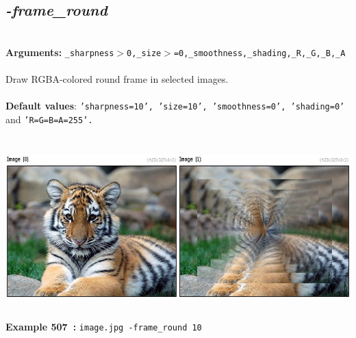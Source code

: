 \documentclass[a4paper,11pt,twoside]{book}
\begin{document}
\subsection{\emph{-frame\_round} }\vspace*{-0.5em}
~\\\textbf{Arguments: } 
{\small \texttt{\_sharpness$>$0,\_size$>$=0,\_smoothness,\_shading,\_R,\_G,\_B,\_A}}\\~\\
Draw RGBA-colored round frame in selected images.
~\\~\\\textbf{Default values}: {\small \texttt{'sharpness=10', 'size=10', 'smoothness=0', 'shading=0'} and \texttt{'R=G=B=A=255'.}}
\begin{center}\includegraphics[keepaspectratio=true,height=7cm,width=\textwidth]{img/gmic_def507.jpg}\\
{\footnotesize \textbf{Example 507~:} \texttt{image.jpg -frame\_round 10}}
\end{center}
\end{document}

